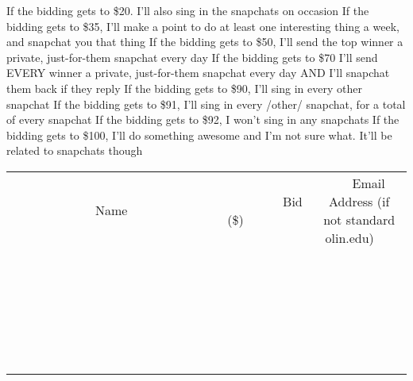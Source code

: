 \documentclass[11pt]{article}
\begin{document}
If the bidding gets to \$20. I'll also sing in the snapchats on occasion
If the bidding gets to \$35, I'll make a point to do at least one interesting thing a week, and snapchat you that thing
If the bidding gets to \$50, I'll send the top winner a private, just-for-them snapchat every day
If the bidding gets to \$70 I'll send EVERY winner a private, just-for-them snapchat every day AND I'll snapchat them back if they reply
If the bidding gets to \$90, I'll sing in every other snapchat
If the bidding gets to \$91, I'll sing in every /other/ snapchat, for a total of every snapchat
If the bidding gets to \$92, I won't sing in any snapchats
If the bidding gets to \$100, I'll do something awesome and I'm not sure what. It'll be related to snapchats though
\\[6ex]
\begin{tabular}{c c c}
~~~~~~~~~~~~~Name~~~~~~~~~~~~~ & ~~~~~~~~~Bid (\$)~~~~~~~~~  & ~~~Email Address (if not standard olin.edu)~~~\\
 & & \\
\hline
 & & \\
\hline
 & & \\
\hline
 & & \\
\hline
 & & \\
\hline
 & & \\
\hline
 & & \\
\hline
 & & \\
\hline
 & & \\
\hline
 & & \\
\hline
 & & \\
\hline
 & & \\
\hline
 & & \\
\hline
 & & \\
\hline
 & & \\
\hline
 & & \\
\hline
 & & \\
\hline
 & & \\
\hline
 & & \\
\hline
 & & \\
\hline
 & & \\
\hline
 & & \\
\hline
 & & \\
\hline
 & & \\
\hline
 & & \\
\hline
 & & \\
\hline
\end{tabular}
\newpage
\end{document}

